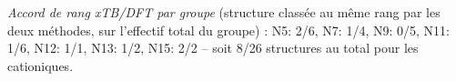 \noindent\textit{Accord de rang xTB/DFT par groupe} (structure class\'ee au m\^eme rang par les deux m\'ethodes, sur l'effectif total du groupe) : N5: 2/6, N7: 1/4, N9: 0/5, N11: 1/6, N12: 1/1, N13: 1/2, N15: 2/2 -- soit 8/26 structures au total pour les cationiques.